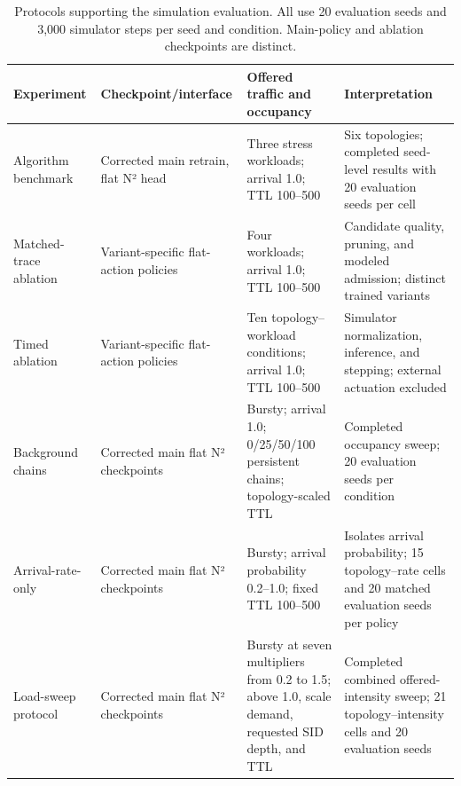 \documentclass[final,5p]{elsarticle}
\newcommand{\rev}[1]{\textcolor{revisiongreen}{#1}}
\let\newrev\rev
\begin{document}
\begin{table}[t]
\centering
\caption{\newrev{Protocols supporting the simulation evaluation. All use 20 evaluation seeds and 3,000 simulator steps per seed and condition. Main-policy and ablation checkpoints are distinct.}}
\label{tab:evaluation_protocols}
\color{revisiongreen}
\scriptsize
\begin{tabular}{p{}p{}p{}p{}}
\toprule
Experiment & Checkpoint/interface & Offered traffic and occupancy & Interpretation \\
\midrule
Algorithm benchmark & Corrected main retrain, flat N² head & Three stress workloads; arrival 1.0; TTL 100--500 & Six topologies; completed seed-level results with 20 evaluation seeds per cell \\
Matched-trace ablation & Variant-specific flat-action policies & Four workloads; arrival 1.0; TTL 100--500 & Candidate quality, pruning, and modeled admission; distinct trained variants \\
Timed ablation & Variant-specific flat-action policies & Ten topology--workload conditions; arrival 1.0; TTL 100--500 & Simulator normalization, inference, and stepping; external actuation excluded \\
Background chains & Corrected main flat N² checkpoints & Bursty; arrival 1.0; 0/25/50/100 persistent chains; topology-scaled TTL & Completed occupancy sweep; 20 evaluation seeds per condition \\
Arrival-rate-only & Corrected main flat N² checkpoints & Bursty; arrival probability 0.2--1.0; fixed TTL 100--500 & Isolates arrival probability; 15 topology--rate cells and 20 matched evaluation seeds per policy \\
Load-sweep protocol & Corrected main flat N² checkpoints & Bursty at seven multipliers from 0.2 to 1.5; above 1.0, scale demand, requested SID depth, and TTL & Completed combined offered-intensity sweep; 21 topology--intensity cells and 20 evaluation seeds \\
\bottomrule
\end{tabular}
\end{table}
\end{document}
